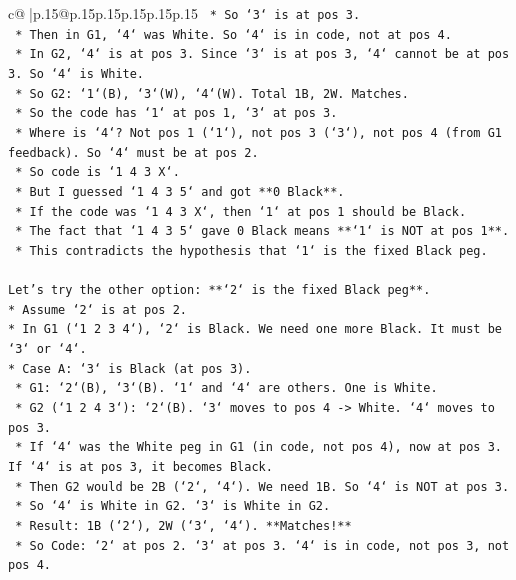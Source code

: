 \documentclass{article}
\begin{document}
{\begin{supertabular}{c@{$\;$}|p{.15\linewidth}@{}p{.15\linewidth}p{.15\linewidth}p{.15\linewidth}p{.15\linewidth}p{.15\linewidth}}
{{{\texttt{    *   So `3` is at pos 3.} \\
\texttt{    *   Then in G1, `4` was White. So `4` is in code, not at pos 4.} \\
\texttt{    *   In G2, `4` is at pos 3. Since `3` is at pos 3, `4` cannot be at pos 3. So `4` is White.} \\
\texttt{    *   So G2: `1`(B), `3`(W), `4`(W). Total 1B, 2W. Matches.} \\
\texttt{    *   So the code has `1` at pos 1, `3` at pos 3.} \\
\texttt{    *   Where is `4`? Not pos 1 (`1`), not pos 3 (`3`), not pos 4 (from G1 feedback). So `4` must be at pos 2.} \\
\texttt{    *   So code is `1 4 3 X`.} \\
\texttt{    *   But I guessed `1 4 3 5` and got **0 Black**.} \\
\texttt{    *   If the code was `1 4 3 X`, then `1` at pos 1 should be Black.} \\
\texttt{    *   The fact that `1 4 3 5` gave 0 Black means **`1` is NOT at pos 1**.} \\
\texttt{    *   This contradicts the hypothesis that `1` is the fixed Black peg.} \\
\\ 
\texttt{Let's try the other option: **`2` is the fixed Black peg**.} \\
\texttt{*   Assume `2` is at pos 2.} \\
\texttt{*   In G1 (`1 2 3 4`), `2` is Black. We need one more Black. It must be `3` or `4`.} \\
\texttt{*   Case A: `3` is Black (at pos 3).} \\
\texttt{    *   G1: `2`(B), `3`(B). `1` and `4` are others. One is White.} \\
\texttt{    *   G2 (`1 2 4 3`): `2`(B). `3` moves to pos 4 {-}> White. `4` moves to pos 3.} \\
\texttt{    *   If `4` was the White peg in G1 (in code, not pos 4), now at pos 3. If `4` is at pos 3, it becomes Black.} \\
\texttt{    *   Then G2 would be 2B (`2`, `4`). We need 1B. So `4` is NOT at pos 3.} \\
\texttt{    *   So `4` is White in G2. `3` is White in G2.} \\
\texttt{    *   Result: 1B (`2`), 2W (`3`, `4`). **Matches!**} \\
\texttt{    *   So Code: `2` at pos 2. `3` at pos 3. `4` is in code, not pos 3, not pos 4.} \\
}}}
\end{supertabular}}
\end{document}
